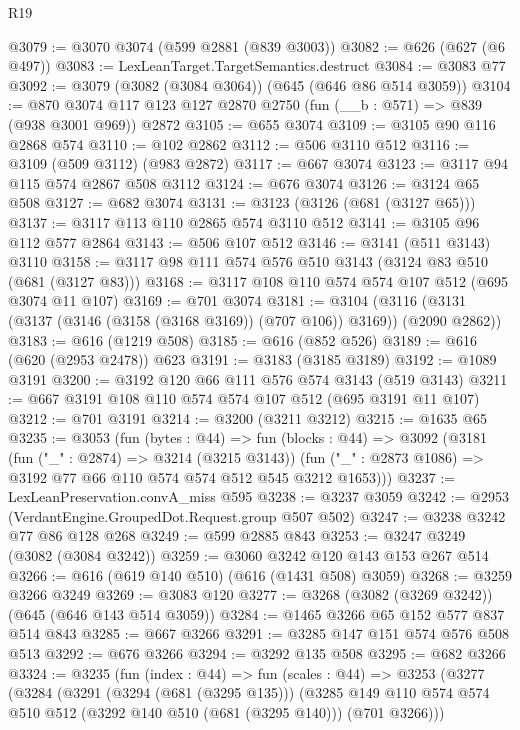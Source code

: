 \begin{lexlean}{R19}
\begin{coremodule}
@3079 := @3070 @3074 (@599 @2881 (@839 @3003))
@3082 := @626 (@627 (@6 @497))
@3083 := LexLeanTarget.TargetSemantics.destruct
@3084 := @3083 @77
@3092 := @3079 (@3082 (@3084 @3064)) (@645 (@646 @86 @514 @3059))
@3104 := @870 @3074 @117 @123 @127 @2870 @2750 (fun (__b : @571) => @839 (@938 @3001 @969)) @2872
@3105 := @655 @3074
@3109 := @3105 @90 @116 @2868 @574
@3110 := @102 @2862
@3112 := @506 @3110 @512
@3116 := @3109 (@509 @3112) (@983 @2872)
@3117 := @667 @3074
@3123 := @3117 @94 @115 @574 @2867 @508 @3112
@3124 := @676 @3074
@3126 := @3124 @65 @508
@3127 := @682 @3074
@3131 := @3123 (@3126 (@681 (@3127 @65)))
@3137 := @3117 @113 @110 @2865 @574 @3110 @512
@3141 := @3105 @96 @112 @577 @2864
@3143 := @506 @107 @512
@3146 := @3141 (@511 @3143) @3110
@3158 := @3117 @98 @111 @574 @576 @510 @3143 (@3124 @83 @510 (@681 (@3127 @83)))
@3168 := @3117 @108 @110 @574 @574 @107 @512 (@695 @3074 @11 @107)
@3169 := @701 @3074
@3181 := @3104 (@3116 (@3131 (@3137 (@3146 (@3158 (@3168 @3169)) (@707 @106)) @3169)) (@2090 @2862))
@3183 := @616 (@1219 @508)
@3185 := @616 (@852 @526)
@3189 := @616 (@620 (@2953 @2478)) @623
@3191 := @3183 (@3185 @3189)
@3192 := @1089 @3191
@3200 := @3192 @120 @66 @111 @576 @574 @3143 (@519 @3143)
@3211 := @667 @3191 @108 @110 @574 @574 @107 @512 (@695 @3191 @11 @107)
@3212 := @701 @3191
@3214 := @3200 (@3211 @3212)
@3215 := @1635 @65
@3235 := @3053
    (fun (bytes : @44) =>
    fun (blocks : @44) =>
    @3092
      (@3181
        (fun ("_" : @2874) => @3214 (@3215 @3143))
        (fun ("_" : @2873 @1086) => @3192 @77 @66 @110 @574 @574 @512 @545 @3212 @1653)))
@3237 := LexLeanPreservation.convA_miss @595
@3238 := @3237 @3059
@3242 := @2953 (VerdantEngine.GroupedDot.Request.group @507 @502)
@3247 := @3238 @3242 @77 @86 @128 @268
@3249 := @599 @2885 @843
@3253 := @3247 @3249 (@3082 (@3084 @3242))
@3259 := @3060 @3242 @120 @143 @153 @267 @514
@3266 := @616 (@619 @140 @510) (@616 (@1431 @508) @3059)
@3268 := @3259 @3266 @3249
@3269 := @3083 @120
@3277 := @3268 (@3082 (@3269 @3242)) (@645 (@646 @143 @514 @3059))
@3284 := @1465 @3266 @65 @152 @577 @837 @514 @843
@3285 := @667 @3266
@3291 := @3285 @147 @151 @574 @576 @508 @513
@3292 := @676 @3266
@3294 := @3292 @135 @508
@3295 := @682 @3266
@3324 := @3235
    (fun (index : @44) =>
    fun (scales : @44) =>
    @3253
      (@3277
        (@3284
          (@3291
            (@3294 (@681 (@3295 @135)))
            (@3285
              @149
              @110
              @574
              @574
              @510
              @512
              (@3292 @140 @510 (@681 (@3295 @140)))
              (@701 @3266)))

\end{coremodule}
\end{lexlean}
